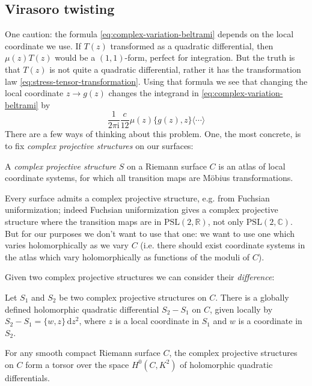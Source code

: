 \documentclass[12pt,letterpaper,reqno]{amsart}
\numberwithin{equation}{section}
\newcommand{\bbR}{\ensuremath{\mathbb R}}
\newcommand{\bbC}{\ensuremath{\mathbb C}}
\newcommand{\I}{{\mathrm i}}
\newcommand{\de}{\mathrm{d}}
\newcommand{\PSL}{\mathrm{PSL}}
\newcommand{\IP}[1]{\langle#1\rangle}
\newcommand{\ti}[1]{\textit{#1}}
\DeclareRobustCommand{\fixme}[1]{\leavevmode{\color{orange}[#1]}}
\begin{document}
\fixme{...}


\subsection{Virasoro twisting}

One caution: the formula \eqref{eq:complex-variation-beltrami} depends on the local coordinate we use. If $T(z)$ transformed as a quadratic
differential, then $\mu(z) T(z)$ would be a $(1,1)$-form, perfect for integration. 
But the truth is that $T(z)$ is not quite a quadratic differential, rather it has
the transformation law \eqref{eq:stress-tensor-transformation}. Using that formula we see that changing the local coordinate $z \to g(z)$ changes
the integrand in \eqref{eq:complex-variation-beltrami} by
\begin{equation}
 \frac{1}{2 \pi \I} \frac{c}{12} \mu(z) \{g(z),z\} \IP{\cdots}
\end{equation}
There are a few ways of thinking about this problem.
One, the most concrete, is to fix \ti{complex projective structures} on our surfaces:
\begin{defn}
A \ti{complex projective structure} $S$ on a Riemann surface $C$ is 
an atlas of local coordinate systems, for which all transition maps are M\"obius transformations.
\end{defn}
Every surface admits a complex projective structure, e.g. from Fuchsian uniformization; indeed Fuchsian uniformization gives
a complex projective structure where the transition maps are in $\PSL(2,\bbR)$, not only $\PSL(2,\bbC)$. 
But for our purposes we don't want to use that one: we want to use one which varies holomorphically as we vary $C$
(i.e. there should exist coordinate systems in the atlas which vary holomorphically as functions of the moduli of $C$).

Given two complex projective structures we can consider their \ti{difference}:
\begin{defn}
Let $S_1$ and $S_2$ be two complex projective structures on $C$.
There is a globally defined holomorphic quadratic differential $S_2 - S_1$ 
on $C$, given locally by $S_2 - S_1 = \{w,z\} \, \de z^2$, where
$z$ is a local coordinate in $S_1$ and $w$ is a coordinate in $S_2$.  
\end{defn}

\begin{prop}
For any smooth compact Riemann surface $C$, the complex projective structures on $C$ form a torsor over the space $H^0(C, K^2)$ of holomorphic
quadratic differentials. 
\end{prop}
\end{document}

